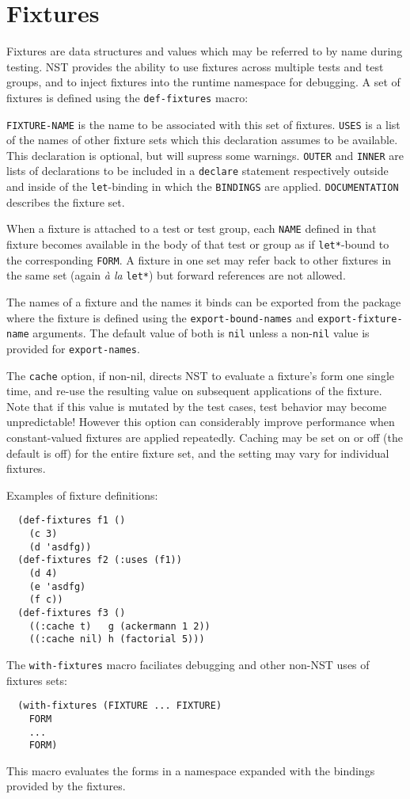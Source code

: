 \section{Fixtures}
\label{fixtures}
Fixtures are data structures and values which may be
referred to by name during testing.  NST provides the ability to use
fixtures across multiple tests and test groups, and to inject fixtures
into the runtime namespace for debugging.
A set of fixtures is defined using the \texttt{def-fixtures}
macro:

%
\texttt{FIXTURE-NAME} is the name to be associated with this set of
fixtures.  \texttt{USES} is a list of the names of other fixture sets
which this declaration assumes to be available.  This declaration is
optional, but will supress some warnings.  \texttt{OUTER} and
\texttt{INNER} are lists of declarations to be included in a
\texttt{declare} statement respectively outside and inside of the
\texttt{let}-binding in which the \texttt{BINDINGS} are applied.
\texttt{DOCUMENTATION} describes the fixture set.

When a fixture is attached to a test or test group, each \texttt{NAME}
defined in that fixture becomes available in the body of that test or
group as if \texttt{let*}-bound to the corresponding \texttt{FORM}.  A
fixture in one set may refer back to other fixtures in the same set
(again \emph{\`a la} \texttt{let*}) but forward references are not
allowed.

The names of a fixture and the names it binds can be exported from the
package where the fixture is defined using the
\texttt{export-bound-names} and \texttt{export-fixture-name}
arguments.  The default value of both is \texttt{nil} unless a
non-\texttt{nil} value is provided for \texttt{export-names}.

The \texttt{cache} option, if non-nil, directs NST to evaluate a
fixture's form one single time, and re-use the resulting value on
subsequent applications of the fixture.  Note that if this value is
mutated by the test cases, test behavior may become unpredictable!
However this option can considerably improve performance when
constant-valued fixtures are applied repeatedly.  Caching may be set
on or off (the default is off) for the entire fixture set, and the
setting may vary for individual fixtures.

Examples of fixture definitions:
\begin{verbatim}
  (def-fixtures f1 ()
    (c 3)
    (d 'asdfg))
  (def-fixtures f2 (:uses (f1))
    (d 4)
    (e 'asdfg)
    (f c))
  (def-fixtures f3 ()
    ((:cache t)   g (ackermann 1 2))
    ((:cache nil) h (factorial 5)))
\end{verbatim}

The \texttt{with-fixtures} macro faciliates debugging and other
non-NST uses of fixtures sets:
\begin{verbatim}
  (with-fixtures (FIXTURE ... FIXTURE)
    FORM
    ...
    FORM)
\end{verbatim}
This macro evaluates the forms in a namespace expanded with the
bindings provided by the fixtures.


